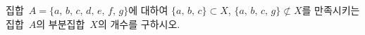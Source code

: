 집합~$A=\{a,\,b,\,c,\,d,\,e,\,f,\,g\}$에 대하여 $\{a,\,b,\,c\}\subset X$, $\{a,\,b,\,c,\,g\}\not\subset X$를 만족시키는 집합~$A$의 부분집합~$X$의 개수를 구하시오.
